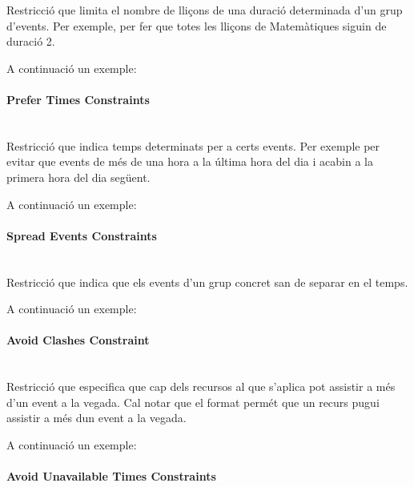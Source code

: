 \documentclass[11pt,a4paper,twoside]{report}
\begin{document}
  Restricció que limita el nombre de lliçons de una duració determinada d'un grup d'events. Per exemple, per fer que totes les lliçons de Matemàtiques siguin de duració 2.


  A continuació un exemple:

  

  \paragraph*{Prefer Times Constraints} ~\\

  Restricció que indica temps determinats per a certs events. Per exemple per evitar que events de més de una hora a la última hora del dia i acabin a la primera hora del dia següent.

  A continuació un exemple:

  


  \paragraph*{Spread Events Constraints} ~\\

  Restricció que indica que els events d'un grup concret san de separar en el temps.

  A continuació un exemple:

  


  \paragraph*{Avoid Clashes Constraint} ~\\
  
  Restricció que especifica que cap dels recursos al que s'aplica pot assistir a més d'un event a la vegada. 
  Cal notar que el format permét que un recurs pugui assistir a més dun event a la vegada.

  A continuació un exemple:

  
  
  \paragraph*{Avoid Unavailable Times Constraints} ~\\
\end{document}
